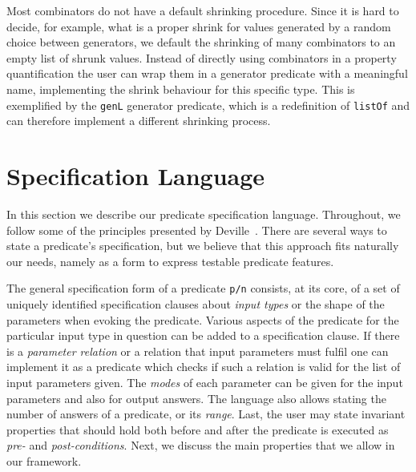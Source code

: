 \documentclass[runningheads,a4paper]{../../PaperStyles/llncs}
\newcommand{\yap}[1]{\lstinline[style=yap]{#1}}
\newcommand{\todo}[2][?]{\marginpar{\raggedright \tiny TODO: #2}}
\begin{document}
Most combinators do not have a default shrinking procedure.
%
Since it is hard to decide, for example, what is a proper shrink for
values generated by a random choice between generators, we default
the shrinking of many combinators to an empty list of shrunk values.
%
Instead of directly using combinators in a property quantification
the user can wrap them in a generator predicate with a meaningful name,
implementing the shrink behaviour for this specific type.
%
This is exemplified by the \yap{genL} generator predicate, which is a
redefinition of \yap{listOf} and can therefore implement a different
shrinking process.

\section{Specification Language}
\label{sec:pred-spec}

In this section we describe our predicate specification language.
%
Throughout, we follow some of the principles presented
by Deville~\cite{Deville1990logprog}.
%
There are several ways to state a predicate's specification, %
but we
 believe that this approach fits naturally our needs, namely as a
form to express testable predicate features. %


The general specification form of a predicate \yap{p/n} consists, at its
core, of a set of uniquely identified specification clauses
 about \emph{input types} or the shape of the parameters when evoking the predicate.
%
%
Various aspects of the predicate for the particular input type in
question can be added to a specification clause.
%
If there is
a \emph{parameter relation} or
 a relation that input parameters must fulfil one can implement it
as a predicate %
which checks if such a relation is
valid for the list of input parameters given.
%
The \emph{modes} of each parameter can be given for the input parameters and also
for  output answers.
%
The language also allows stating the number of
answers of a predicate,
or its \emph{range}.
%
Last, the user may state invariant properties that should hold both
before and after the predicate is executed as \emph{pre-} and \emph{post-conditions}.
%
Next, we discuss the main properties that we allow in our framework.
\end{document}
